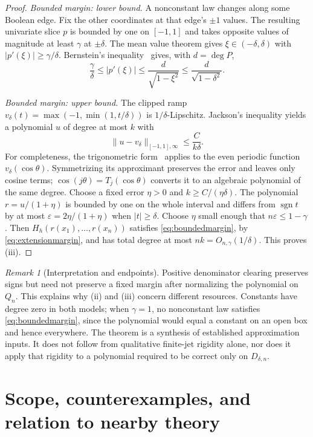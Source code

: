 \documentclass[11pt]{article}
\theoremstyle{definition}
\theoremstyle{remark}
\newtheorem{remark}[theorem]{Remark}
\newcommand{\sign}{\operatorname{sgn}}
\newcommand{\eps}{\varepsilon}
\begin{document}
\begin{proof}
\emph{Bounded margin: lower bound.} A nonconstant law changes along some Boolean edge. Fix the other coordinates at that edge's $\pm1$ values. The resulting univariate slice $p$ is bounded by one on $[-1,1]$ and takes opposite values of magnitude at least $\gamma$ at $\pm\delta$. The mean value theorem gives $\xi\in(-\delta,\delta)$ with $|p'(\xi)|\ge\gamma/\delta$. Bernstein's inequality~\cite[Theorem~24.1]{KopotunPrymakShevchuk2018} gives, with $d=\deg P$,
\[
 \frac\gamma\delta\le |p'(\xi)|
 \le\frac d{\sqrt{1-\xi^2}}
 \le\frac d{\sqrt{1-\delta^2}}.
\]

\emph{Bounded margin: upper bound.} The clipped ramp
$v_\delta(t)=\max(-1,\min(1,t/\delta))$ is $1/\delta$-Lipschitz. Jackson's inequality yields a polynomial $u$ of degree at most $k$ with
\[
 \|u-v_\delta\|_{[-1,1],\infty}\le\frac C{k\delta}.
\]
For completeness, the trigonometric form~\cite[Theorem~21.1]{KopotunPrymakShevchuk2018} applies to the even periodic function $v_\delta(\cos\theta)$. Symmetrizing its approximant preserves the error and leaves only cosine terms; $\cos(j\theta)=T_j(\cos\theta)$ converts it to an algebraic polynomial of the same degree.
Choose a fixed error $\eta>0$ and $k\ge C/(\eta\delta)$. The polynomial $r=u/(1+\eta)$ is bounded by one on the whole interval and differs from $\sign t$ by at most $\eps=2\eta/(1+\eta)$ when $|t|\ge\delta$. Choose $\eta$ small enough that $n\eps\le1-\gamma$. Then $H_h(r(x_1),\ldots,r(x_n))$ satisfies \eqref{eq:boundedmargin}, by \eqref{eq:extensionmargin}, and has total degree at most $nk=O_{n,\gamma}(1/\delta)$. This proves (iii).
\end{proof}

\begin{remark}[Interpretation and endpoints]
Positive denominator clearing preserves signs but need not preserve a fixed margin after normalizing the polynomial on $Q_n$. This explains why (ii) and (iii) concern different resources. Constants have degree zero in both models; when $\gamma=1$, no nonconstant law satisfies \eqref{eq:boundedmargin}, since the polynomial would equal a constant on an open box and hence everywhere. The theorem is a synthesis of established approximation inputs. It does not follow from qualitative finite-jet rigidity alone, nor does it apply that rigidity to a polynomial required to be correct only on $D_{\delta,n}$.
\end{remark}

\section{Scope, counterexamples, and relation to nearby theory}\label{sec:scope}
\end{document}

